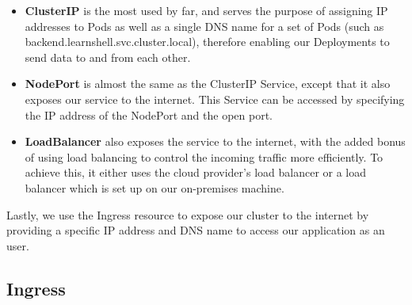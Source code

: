 \documentclass[thesis=B,english]{FITthesis}[2019/12/23]
\begin{document}
\begin{itemize}
  \setlength\itemsep{0em}
  \item \textbf{ClusterIP} is the most used by far, and serves the purpose of assigning IP addresses to Pods as well as a single DNS name for a set of Pods (such as backend.learnshell.svc.cluster.local), therefore enabling our Deployments to send data to and from each other.
  \item \textbf{NodePort} is almost the same as the ClusterIP Service, except that it also exposes our service to the internet. This Service can be accessed by specifying the IP address of the NodePort and the open port.
  \item \textbf{LoadBalancer} also exposes the service to the internet, with the added bonus of using load balancing to control the incoming traffic more efficiently. To achieve this, it either uses the cloud provider's load balancer or a load balancer which is set up on our on-premises machine.
\end{itemize}

Lastly, we use the Ingress resource to expose our cluster to the internet by providing a specific IP address and DNS name to access our application as an user. 

\subsection{Ingress}
\end{document}
